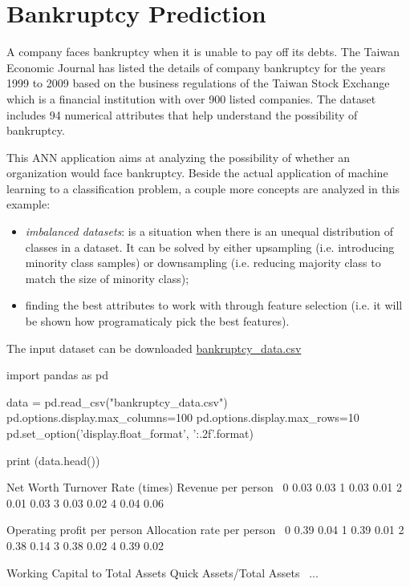 \section{Bankruptcy Prediction}
A company faces bankruptcy when it is unable to pay off its debts. The Taiwan Economic Journal has listed the details of company bankruptcy for the years 1999 to 2009 based on the business regulations of the Taiwan Stock Exchange which is a financial institution with over 900 listed companies. The dataset includes 94 numerical attributes that help understand the possibility of bankruptcy.

This ANN application aims at analyzing the possibility of whether an organization would face bankruptcy. Beside the actual application of machine learning to a classification problem, a couple more concepts are analyzed in this example:
\begin{itemize}
\item \emph{imbalanced datasets}: is a situation when there is an unequal distribution of classes in a dataset. It can be solved by either upsampling (i.e. introducing minority class samples) or downsampling (i.e. reducing majority class to match the size of minority class);
\item finding the best attributes to work with through feature selection (i.e. it will be shown how programaticaly pick the best features).
\end{itemize}

The input dataset can be downloaded \href{https://raw.githubusercontent.com/matteosan1/finance_course/develop/libro/input_files/bankruptcy_data.csv}{bankruptcy\_data.csv}
\begin{ipython}
import pandas as pd
	
data = pd.read_csv("bankruptcy_data.csv")
pd.options.display.max_columns=100
pd.options.display.max_rows=10
pd.set_option('display.float_format', '{:.2f}'.format)
	
print (data.head())
\end{ipython}
\begin{ioutput}
Net Worth Turnover Rate (times)  Revenue per person  \
0                          0.03                0.03   
1                          0.03                0.01   
2                          0.01                0.03   
3                          0.03                0.02   
4                          0.04                0.06   
	
Operating profit per person  Allocation rate per person  \
0                      0.39                        0.04   
1                      0.39                        0.01   
2                      0.38                        0.14   
3                      0.38                        0.02   
4                      0.39                        0.02   

Working Capital to Total Assets  Quick Assets/Total Assets  \
...                        
\end{ioutput}

